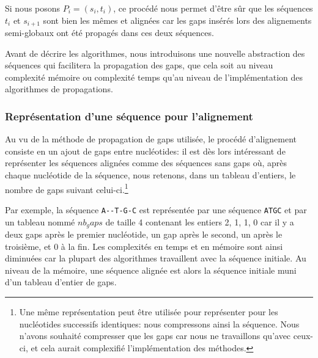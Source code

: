 Si nous posons $P_{i} = (s_{i}, t_{i})$, ce procédé nous permet d'être sûr que
les séquences $t_{i}$ et $s_{i + 1}$ sont bien les mêmes et alignées car les
gaps insérés lors des alignements semi-globaux ont été propagés dans ces deux
séquences.

Avant de décrire les algorithmes, nous introduisons une nouvelle abstraction des
séquences qui facilitera la propagation des gaps, que cela soit au niveau
complexité mémoire ou complexité temps qu'au niveau de l'implémentation des
algorithmes de propagations.

\subsubsection{Représentation d'une séquence pour l'alignement}
\label{subsubsection:repr_sequence_alignment}

Au vu de la méthode de propagation de gaps utilisée, le procédé d'alignement
consiste en un ajout de gaps entre nucléotides: il est dès lors intéressant de
représenter les séquences alignées comme des séquences sans gaps où, après
chaque nucléotide de la séquence, nous retenons, dans un tableau d'entiers, le
nombre de gaps suivant celui-ci.\footnote{Une même représentation peut être
	utilisée pour représenter pour les nucléotides successifs identiques: nous
	compressons ainsi la séquence. Nous n'avons souhaité compresser que les gaps
	car nous ne travaillons qu'avec ceux-ci, et cela aurait complexifié
l'implémentation des méthodes.}

Par exemple, la séquence \verb|A--T-G-C| est représentée par une séquence
\verb|ATGC| et par un tableau nommé \emph{$nb_gaps$} de taille 4
contenant les entiers {2, 1, 1, 0} car il y a deux gaps après le premier
nucléotide, un gap après le second, un après le troisième, et 0 à la fin. Les
complexités en temps et en mémoire sont ainsi diminuées car la plupart des
algorithmes travaillent avec la séquence initiale.
Au niveau de la mémoire, une séquence alignée est alors la
séquence initiale muni d'un tableau d'entier de gaps.

